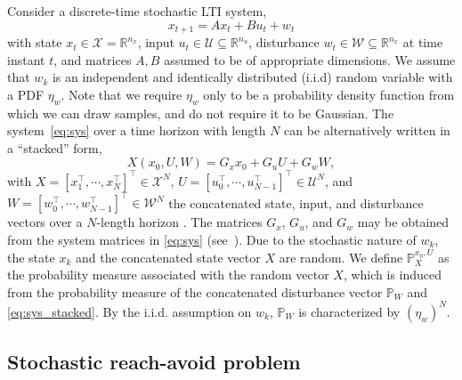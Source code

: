 \documentclass[11pt,letterpaper]{article}
\newcommand{\R}{\mathbb{R}}
\newcommand{\U}{\mathcal{U}}
\newcommand{\W}{\mathcal{W}}
\newcommand{\X}{\mathcal{X}}
\newcommand{\Prob}{\mathbb{P}}
\begin{document}
	Consider a discrete-time stochastic LTI system,
	\begin{equation} \label{eq:sys}
	x_{t+1}=Ax_t+Bu_t+w_t
	\end{equation}
    with state  $x_t\in \X=\R^{n_x}$,
    input $u_{t}\in \U\subseteq\R^{n_u}$, disturbance $w_t\in \W\subseteq\R^{n_x}$ at time instant $t$, and matrices $A,B$ assumed to be of appropriate dimensions.
	We assume that $w_k$ is an  independent and identically distributed (i.i.d) random variable with a PDF $\eta_{w}$.
	Note that we require $\eta_{w}$ only to be a probability density function from which we can draw samples, and do not require it to be Gaussian.
	The system~\eqref{eq:sys} over a time horizon with length $N$ can be alternatively written in a ``stacked'' form,
	\begin{equation} \label{eq:sys_stacked}
	X(x_{0},U,W)=G_{x}x_0+G_{u}U+G_{w}W,
	\end{equation}
	with $X=[x_{1}^{\top},\cdots,x_{N}^{\top}]^\top \in \X^N$,  $U=[u_{0}^{\top},\cdots,u_{N-1}^{\top}]^\top\in \U^N$, and $W=[w_{0}^{\top},\cdots,w_{N-1}^{\top}]^\top\in \W^N$ the concatenated state, input, and disturbance vectors over a $N$-length horizon \cite{sartipizadeh2018CCTOOL}. 
	The matrices $G_{x}$, $G_{u}$, and $G_{w}$ may be obtained from the system matrices in \eqref{eq:sys} (see~\cite{sartipizadeh2018CCTOOL}). 
	Due to the stochastic nature of $w_k$, the state $x_k$ and the concatenated state vector $X$ are random.
	We define $\Prob_{X}^{x_0,U}$ as the probability measure associated with the random vector $X$, which is induced from the probability measure of the concatenated disturbance vector $\Prob_W$ and \eqref{eq:sys_stacked}.
	By the i.i.d. assumption on $w_k$, $\Prob_W$ is characterized by $(\eta_{w})^N$.
	
	
	\subsection{Stochastic reach-avoid problem}
	
\end{document}
